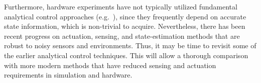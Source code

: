 Furthermore, hardware experiments have not typically utilized
fundamental analytical control approaches (e.g.~\cite{sultan2002}),
since they frequently depend on accurate state information, which is
non-trivial to acquire.  Nevertheless, there has been recent progress
on actuation, sensing, and state-estimation methods that are robust to
noisy sensors and environments.  Thus, it may be time to revisit some
of the earlier analytical control techniques. This will allow a
thorough comparison with more modern methods that have reduced sensing
and actuation requirements in simulation and hardware.




